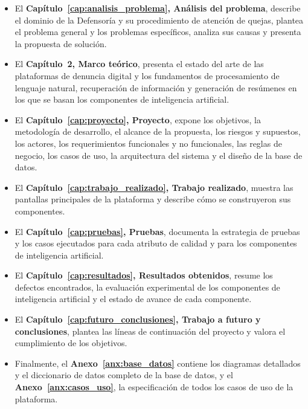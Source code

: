 \begin{itemize}
	\item El \textbf{Capítulo~\ref{cap:analisis_problema}, Análisis del problema}, describe el dominio de la Defensoría y su procedimiento de atención de quejas, plantea el problema general y los problemas específicos, analiza sus causas y presenta la propuesta de solución.
	\item El \textbf{Capítulo~2, Marco teórico}, presenta el estado del arte de las plataformas de denuncia digital y los fundamentos de procesamiento de lenguaje natural, recuperación de información y generación de resúmenes en los que se basan los componentes de inteligencia artificial.
	\item El \textbf{Capítulo~\ref{cap:proyecto}, Proyecto}, expone los objetivos, la metodología de desarrollo, el alcance de la propuesta, los riesgos y supuestos, los actores, los requerimientos funcionales y no funcionales, las reglas de negocio, los casos de uso, la arquitectura del sistema y el diseño de la base de datos.
	\item El \textbf{Capítulo~\ref{cap:trabajo_realizado}, Trabajo realizado}, muestra las pantallas principales de la plataforma y describe cómo se construyeron sus componentes.
	\item El \textbf{Capítulo~\ref{cap:pruebas}, Pruebas}, documenta la estrategia de pruebas y los casos ejecutados para cada atributo de calidad y para los componentes de inteligencia artificial.
	\item El \textbf{Capítulo~\ref{cap:resultados}, Resultados obtenidos}, resume los defectos encontrados, la evaluación experimental de los componentes de inteligencia artificial y el estado de avance de cada componente.
	\item El \textbf{Capítulo~\ref{cap:futuro_conclusiones}, Trabajo a futuro y conclusiones}, plantea las líneas de continuación del proyecto y valora el cumplimiento de los objetivos.
	\item Finalmente, el \textbf{Anexo~\ref{anx:base_datos}} contiene los diagramas detallados y el diccionario de datos completo de la base de datos, y el \textbf{Anexo~\ref{anx:casos_uso}}, la especificación de todos los casos de uso de la plataforma.
\end{itemize}
